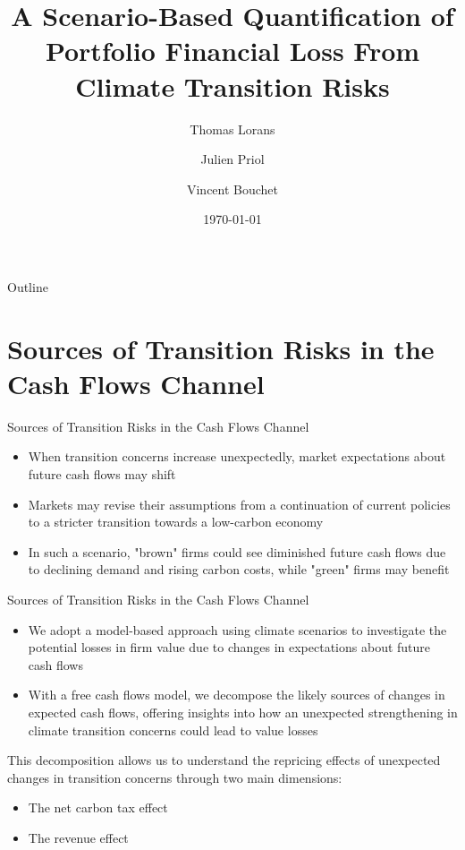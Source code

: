 \documentclass{beamer}
\title[Beyond Carbon Price]{A Scenario-Based Quantification of Portfolio Financial Loss From Climate Transition Risks}
\author{Thomas Lorans \and Julien Priol \and Vincent Bouchet}
\institute[SP]{Scientific Portfolio}
\date{\today}
\begin{document}
\begin{frame}
  \titlepage %
\end{frame}

\begin{frame}{Outline}
  \tableofcontents %
\end{frame}

\section{Sources of Transition Risks in the Cash Flows Channel}

\begin{frame}{Sources of Transition Risks in the Cash Flows Channel}

  \begin{itemize}
    \item When transition concerns increase unexpectedly, market expectations about future cash flows may shift
    \item Markets may revise their assumptions from a continuation of current policies to a stricter transition towards a low-carbon economy
    \item In such a scenario, "brown" firms could see diminished future cash flows due to declining demand and rising carbon costs, while "green" firms may benefit
  \end{itemize}

\end{frame}


\begin{frame}{Sources of Transition Risks in the Cash Flows Channel}
  \begin{itemize}
    \item We adopt a model-based approach using climate scenarios to investigate the potential losses in firm value due to changes in expectations about future cash flows
    \item With a free cash flows model, we decompose the likely sources of changes in expected cash flows, offering insights into how an unexpected strengthening in climate transition concerns could lead to value losses
  \end{itemize}
  This decomposition allows us to understand the repricing effects of unexpected changes in transition concerns through two main dimensions:
  \begin{itemize}
    \item The net carbon tax effect
    \item The revenue effect
  \end{itemize}
\end{frame}
\end{document}
